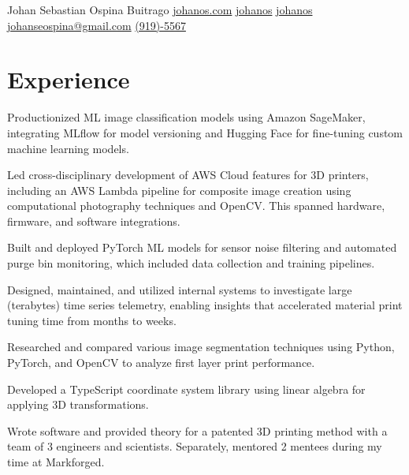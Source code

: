 \documentclass[]{plushcv}
\begin{document}
%
%
    
\namesection
{Johan Sebastian }
{Ospina Buitrago}
{}
{
    \contactline
    {\href{https://www.johanos.com}{johanos.com}}
    {\href{https://www.github.com/johanos}{johanos}}
    {\href{https://www.linkedin.com/in/johanos}
        {johanos}}
    {\href{mailto:johanseospina@gmail.com}{johanseospina@gmail.com}}
    {\href{tel:+1 (919) 946-5567}{(919)-5567}}
}

%
%

\begin{minipage}[t]{0.70\textwidth}



    \section{Experience}
    \vspace{\topsep} %
    \begin{tightemize}
        \sectionsep
        \item Productionized ML image classification models using Amazon SageMaker, integrating MLflow for model versioning and Hugging Face for fine-tuning custom machine learning models.
        \item Led cross-disciplinary development of AWS Cloud features for 3D printers, including an AWS Lambda pipeline for composite image creation using computational photography techniques and OpenCV\@. This spanned hardware, firmware, and software integrations.
        \item Built and deployed PyTorch ML models for sensor noise filtering and automated purge bin monitoring, which included data collection and training pipelines.
        \item Designed, maintained, and utilized internal systems to investigate large (terabytes) time series telemetry, enabling insights that accelerated material print tuning time from months to weeks.
        \item Researched and compared various image segmentation techniques using Python, PyTorch, and OpenCV to analyze first layer print performance.
        \item Developed a TypeScript coordinate system library using linear algebra for applying 3D transformations.
        \item Wrote software and provided theory for a patented 3D printing method with a team of 3 engineers and scientists. Separately, mentored 2 mentees during my time at Markforged.
    \end{tightemize}
    \sectionsep


\end{minipage}
\end{document}
